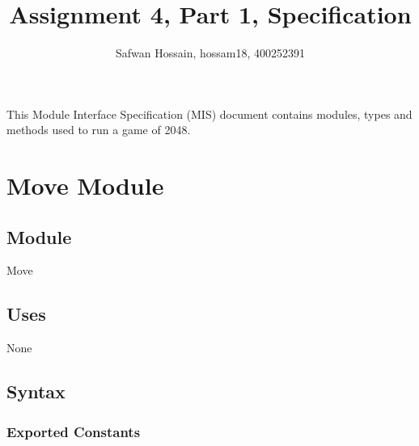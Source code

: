\documentclass[12pt]{article}
\title{Assignment 4, Part 1, Specification}
\author{Safwan Hossain, hossam18, 400252391}
\newcommand{\authornote}[3]{\textcolor{#1}{[#3 ---#2]}}
\newcommand{\authornote}[3]{}
\newcommand{\wss}[1]{\authornote{blue}{SS}{#1}}
\begin{document}
\maketitle
This Module Interface Specification (MIS) document contains modules, types and
methods used to run a game of 2048.





% 
% 

\newpage

\section* {Move Module}

\subsection*{Module}

Move

\subsection* {Uses}

None

\subsection* {Syntax}

\subsubsection* {Exported Constants}
\end{document}
